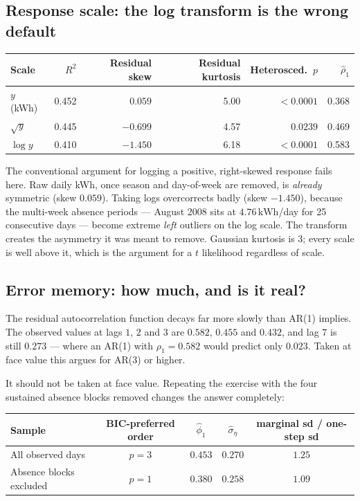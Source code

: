 \documentclass[11pt]{article}
\newcommand{\kwh}{\,\mathrm{kWh}}
\begin{document}
\subsection{Response scale: the log transform is the wrong default}

\begin{center}
\small
\begin{tabular}{@{}lrrrrr@{}}
\toprule
Scale & $R^2$ & Residual skew & Residual kurtosis & Heterosced.\ $p$ & $\hat\rho_1$ \\
\midrule
$y$ (kWh)     & 0.452 & $\phantom{-}0.059$ & 5.00 & $<0.0001$ & 0.368 \\
$\sqrt{y}$    & 0.445 & $-0.699$ & 4.57 & $0.0239$ & 0.469 \\
$\log y$      & 0.410 & $-1.450$ & 6.18 & $<0.0001$ & 0.583 \\
\bottomrule
\end{tabular}
\end{center}

The conventional argument for logging a positive, right-skewed response fails
here. Raw daily kWh, once season and day-of-week are removed, is
\emph{already} symmetric (skew $0.059$). Taking logs overcorrects badly
(skew $-1.450$), because the multi-week absence periods --- August 2008 sits at
$4.76\kwh$/day for 25 consecutive days --- become extreme \emph{left} outliers
on the log scale. The transform creates the asymmetry it was meant to remove.
Gaussian kurtosis is $3$; every scale is well above it, which is the argument
for a $t$ likelihood regardless of scale.

\subsection{Error memory: how much, and is it real?}

The residual autocorrelation function decays far more slowly than AR(1)
implies. The observed values at lags $1$, $2$ and $3$ are $0.582$, $0.455$ and
$0.432$, and lag $7$ is still $0.273$ --- where an AR(1) with
$\rho_1 = 0.582$ would predict only $0.023$. Taken at face value this argues
for AR(3) or higher.

It should not be taken at face value. Repeating the exercise with the four
sustained absence blocks removed changes the answer completely:

\begin{center}
\small
\begin{tabular}{@{}lcccc@{}}
\toprule
Sample & BIC-preferred order & $\hat\phi_1$ & $\hat\sigma_\eta$ & marginal sd / one-step sd \\
\midrule
All observed days & $p=3$ & $0.453$ & $0.270$ & $1.25$ \\
Absence blocks excluded & $p=1$ & $0.380$ & $0.258$ & $1.09$ \\
\bottomrule
\end{tabular}
\end{center}
\end{document}
